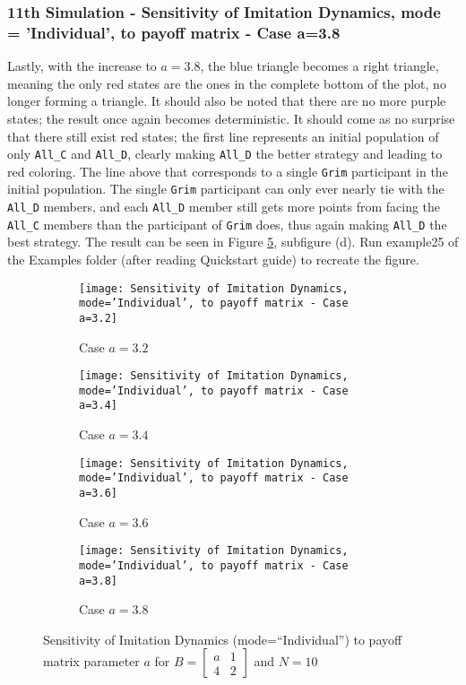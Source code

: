 \subsubsection{11th Simulation - Sensitivity of Imitation Dynamics, mode = 'Individual', to payoff matrix - Case a=3.8}
Lastly, with the increase to $a=3.8$, the blue triangle becomes a right triangle, meaning the only red states are the ones in the complete bottom of the plot, no longer forming a triangle. It should also be noted that there are no more purple states; the result once again becomes deterministic. It should come as no surprise that there still exist red states; the first line represents an initial population of only \texttt{All\_C} and \texttt{All\_D}, clearly making \texttt{All\_D} the better strategy and leading to red coloring. The line above that corresponds to a single \texttt{Grim} participant in the initial population. The single \texttt{Grim} participant can only ever nearly tie with the \texttt{All\_D} members, and each \texttt{All\_D} member still gets more points from facing the \texttt{All\_C} members than the participant of \texttt{Grim} does, thus again making \texttt{All\_D} the best strategy. The result can be seen in Figure \ref{fig:Sensitivity of Imitation Dynamics, mode='Individual', to payoff matrix}, subfigure (d). Run example25 of the Examples folder (after reading Quickstart guide) to recreate the figure.

	\begin{figure}[h]
		\centering
		\begin{subfigure}{.49\textwidth}
			\centering
			\texttt{[image: Sensitivity of Imitation Dynamics, mode='Individual', to payoff matrix - Case a=3.2]}
			\caption{Case $a=3.2$}
			\label{fig:example22}
		\end{subfigure}
		\begin{subfigure}{.49\textwidth}
			\centering
			\texttt{[image: Sensitivity of Imitation Dynamics, mode='Individual', to payoff matrix - Case a=3.4]}
			\caption{Case $a=3.4$}
			\label{fig:example23}
		\end{subfigure}
		\vspace{0.5em}
		\begin{subfigure}{.49\textwidth}
			\centering
			\texttt{[image: Sensitivity of Imitation Dynamics, mode='Individual', to payoff matrix - Case a=3.6]}
			\caption{Case $a=3.6$}
			\label{fig:example24}
		\end{subfigure}
		\begin{subfigure}{.49\textwidth}
			\centering
			\texttt{[image: Sensitivity of Imitation Dynamics, mode='Individual', to payoff matrix - Case a=3.8]}
			\caption{Case $a=3.8$}
			\label{fig:example25}
		\end{subfigure}
		\caption{Sensitivity of Imitation Dynamics (mode=``Individual'') to payoff matrix parameter $a$ for $B = \begin{bmatrix} a & 1 \\ 4 & 2 \end{bmatrix}$ and $N=10$}
		\label{fig:Sensitivity of Imitation Dynamics, mode='Individual', to payoff matrix}
	\end{figure}

